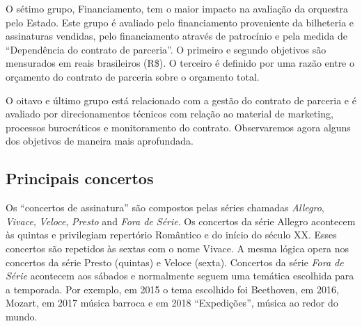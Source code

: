 \documentclass[a4paper, 12pt, openright, oneside, german, french, english, brazil]{abntex2}
\begin{document}
	O sétimo grupo, Financiamento, tem o maior impacto na avaliação da orquestra pelo Estado. Este grupo é avaliado pelo financiamento proveniente da bilheteria e assinaturas vendidas, pelo financiamento através de patrocínio e pela medida de ``Dependência do contrato de parceria''. O primeiro e segundo objetivos são mensurados em reais brasileiros (R\$). O terceiro é definido por uma razão entre o orçamento do contrato de parceria sobre o orçamento total.
	
	
	O oitavo e último grupo está relacionado com a gestão do contrato de parceria e é avaliado por direcionamentos técnicos com relação ao material de marketing, processos burocráticos e monitoramento do contrato. Observaremos agora alguns dos objetivos de maneira mais aprofundada.
	
	\subsection{Principais concertos}
	
	
	Os ``concertos de assinatura'' são compostos pelas séries chamadas \textit{Allegro}, \textit{Vivace}, \textit{Veloce}, \textit{Presto} and \textit{Fora de Série}. Os concertos da série Allegro acontecem às quintas e privilegiam repertório Romântico e do início do século XX. Esses concertos são repetidos às sextas com o nome Vivace. A mesma lógica opera nos concertos da série Presto (quintas) e Veloce (sexta). Concertos da série \textit{Fora de Série} acontecem aos sábados e normalmente seguem uma temática escolhida para a temporada. Por exemplo, em 2015 o tema escolhido foi Beethoven, em 2016, Mozart, em 2017 música barroca e em 2018 ``Expedições'', música ao redor do mundo.
	
\end{document}
